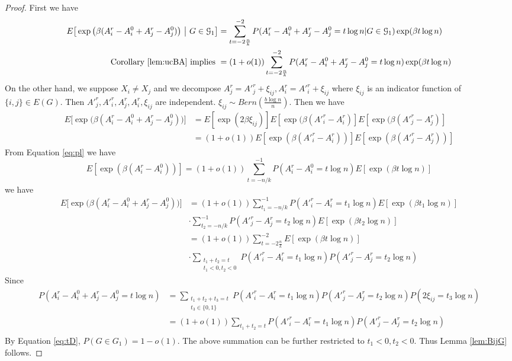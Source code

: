 \documentclass{article}
\begin{document}
\begin{proof}
First we have
\begin{align}
E \big[  \exp\big(\beta (A^r_i - A^0_i + A^r_j - A^0_j) \big) ~\big|~ G\in\mathcal{G}_1 \big] 
&= \sum_{t=-2\frac{n}{k}}^{-2} P(A^r_i - A^0_i + A^r_j - A^0_j = t\log n | G \in \mathcal{G}_1) \exp(\beta t \log n) \notag \\
\text{ Corollary \ref{lem:ucBA} implies }&= (1+o(1))\sum_{t=-2\frac{n}{k}}^{-2} P(A^r_i - A^0_i + A^r_j - A^0_j = t\log n) \exp(\beta t \log n)
\end{align}
On the other hand, we suppose $X_i \neq X_j$ and we decompose $A^r_j = A'^r_j + \xi_{ij}, A^r_i = A'^r_i + \xi_{ij}$ where $\xi_{ij}$ is an indicator function of $\{i,j\} \in E(G)$. Then $A'^r_j, A'^r_i, A^r_j, A^r_i, \xi_{ij}$ are independent.
$\xi_{ij} \sim Bern(\frac{b\log n}{n})$.
Then we have
\begin{align*}
E \big[  \exp\big(\beta (A^r_i - A^0_i + A^r_j - A^0_j ) \big) \big] & = E[\exp(2\beta \xi_{ij})] E[\exp(\beta (A'^r_i - A^r_i)]
E[\exp(\beta (A'^r_j - A^r_j)] \\
& = (1+o(1))E[\exp(\beta(A'^r_i - A^r_i))] E[\exp(\beta(A'^r_j - A^r_j))]
\end{align*}
From Equation \eqref{eq:pl} we have
$$
E[\exp(\beta(A^r_i - A^0_i))] = (1+o(1)) \sum_{t=-n/k}^{-1} P(A^r_i - A^0_i = t \log n)E[\exp(\beta t \log n)]
$$
we have
\begin{align*}
E \big[  \exp\big(\beta (A^r_i - A^0_i + A^r_j - A^0_j ) \big) \big] & = (1+o(1))
\sum_{t_1=-n/k}^{-1} P(A'^r_i - A^r_i = t_1 \log n)E[\exp(\beta t_1 \log n)] \\
& \cdot
\sum_{t_2=-n/k}^{-1} P(A'^r_j - A^r_j = t_2 \log n)E[\exp(\beta t_2 \log n)] \\
& = (1+o(1))  \sum_{t=-2\frac{n}{k}}^{-2} E[\exp(\beta t \log n)]\\
& \cdot \sum_{\substack{t_1 + t_2 = t \\ t_1 < 0, t_2 < 0}}
P(A'^r_i - A^r_i = t_1 \log n) P(A'^r_j - A^r_j = t_2\log n)
\end{align*}
Since 
\begin{align*}
P(A^r_i - A^0_i + A^r_j - A^0_j = t\log n)
&= \sum_{\substack{t_1 + t_2 + t_3 = t\\ t_3 \in\{0, 1\}}} P(A'^r_i - A^r_i = t_1 \log n) P(A'^r_j - A^r_j = t_2 \log n) P(2\xi_{ij} = t_3 \log n) \\
&=(1+o(1)) \sum_{t_1 + t_2 = t} P(A'^r_i - A^r_i = t_1 \log n) P(A'^r_j - A^r_j = t_2 \log n)  \\
\end{align*}
By Equation \ref{eq:tD}, $P(G\in G_1) = 1-o(1)$. The above summation can be further restricted to $t_1 < 0, t_2 < 0$. Thus Lemma \ref{lem:BijG} follows. 
\end{proof}
\end{document}
